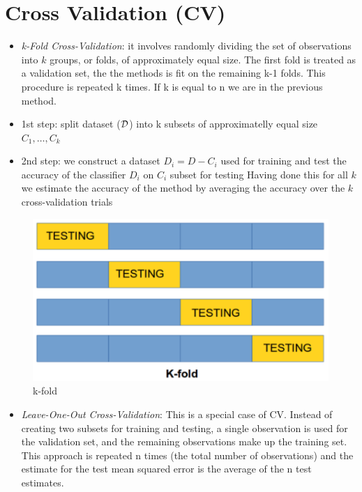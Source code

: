 \documentclass[]{book}
\providecommand{\tightlist}{%
  \setlength{\itemsep}{0pt}\setlength{\parskip}{0pt}}
\theoremstyle{definition}
\theoremstyle{definition}
\theoremstyle{remark}
\begin{document}
{\section{Cross Validation (CV)}\label{cross-validation-cv}

\begin{itemize}
\item
  \emph{k-Fold Cross-Validation}: it involves randomly dividing the set
  of observations into \(k\) groups, or folds, of approximately equal
  size. The first fold is treated as a validation set, the the methods
  is fit on the remaining k-1 folds. This procedure is repeated k times.
  If k is equal to n we are in the previous method.
\item
  1st step: split dataset (\(\cal D\)) into k subsets of approximatelly
  equal size \(C_1, \dots, C_k\)
\item
  2nd step: we construct a dataset \(D_i = D-C_i\) used for training and
  test the accuracy of the classifier \(D_i\) on \(C_i\) subset for
  testing Having done this for all \(k\) we estimate the accuracy of the
  method by averaging the accuracy over the \(k\) cross-validation
  trials
\end{itemize}

\begin{figure}[htbp]
\centering
\includegraphics{figures/kfold.png}
\caption{k-fold}
\end{figure}

\begin{itemize}
\tightlist
\item
  \emph{Leave-One-Out Cross-Validation}: This is a special case of CV.
  Instead of creating two subsets for training and testing, a single
  observation is used for the validation set, and the remaining
  observations make up the training set. This approach is repeated n
  times (the total number of observations) and the estimate for the test
  mean squared error is the average of the n test estimates.
\end{itemize}

}
\end{document}
